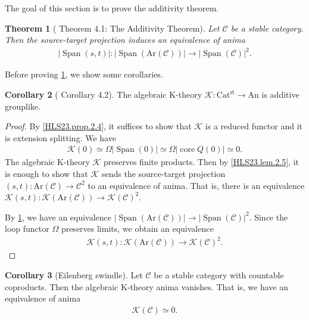 \documentclass[a4paper,dvipdfmx,11pt,reqno]{amsart}
\newcommand{\C}{\mathcal{C}}
\newcommand{\K}{\mathcal{K}}
\DeclareMathOperator{\core}{core}
\DeclareMathOperator{\Span}{Span}
\newcommand{\An}{\mathrm{An}}
\newcommand{\Catst}{\mathrm{Cat^{st}}}
\newcommand{\Ar}{\mathrm{Ar}}
\newtheorem{theorem}{Theorem}[section]
\theoremstyle{definition}
\newtheorem{corollary}[theorem]{Corollary}
\begin{document}
The goal of this section is to prove the additivity theorem.

\begin{theorem}[\cite{HLS23} Theorem 4.1: The Additivity Theorem] \label{thrm.additivity_theorem}
  Let $\C$ be a stable category.
  Then the source-target projection induces an equivalence of anima 
  \begin{align*}
    |\Span(s,t)| : |\Span(\Ar(\C))| \to |\Span(\C)|^2.
  \end{align*}
\end{theorem}

Before proving \cref{thrm.additivity_theorem}, we show some corollaries.

\begin{corollary}[\cite{HLS23} Corollary 4.2] \label{HLS23.cor.4.2}
  The algebraic K-theory $\K : \Catst \to \An$ is additive grouplike.
\end{corollary}

\begin{proof}
  By \cref{HLS23.prop.2.4}, it suffices to show that $\K$ is a reduced functor and it is extension splitting.
  We have 
  \begin{align*}
    \K(0) \simeq \Omega|\Span(0)| \simeq \Omega|\core Q(0)| \simeq 0.
  \end{align*}
  The algebraic K-theory $\K$ preserves finite products.
  Then by \cref{HLS23.lem.2.5}, it is enough to show that $\K$ sends the source-target projection $(s,t) : \Ar(\C) \to \C^2$ to an equivalence of anima.
  That is, there is an equivalence $\K(s,t) : \K(\Ar(\C)) \to \K(\C)^2$.
  
  By \cref{thrm.additivity_theorem}, we have an equivalence $|\Span(\Ar(\C))| \to |\Span(\C)|^2$.
  Since the loop functor $\Omega$ preserves limits, we obtain an equivalence
  \begin{align*}
    \K(s,t) : \K(\Ar(\C)) \to \K(\C)^2.
  \end{align*}
\end{proof}

\begin{corollary}[Eilenberg swindle] \label{Ber.prop.A.4}
  Let $\C$ be a stable category with countable coproducts.
  Then the algebraic K-theory anima vanishes.
  That is, we have an equivalence of anima
  \begin{align*}
    \K(\C) \simeq 0.
  \end{align*}
\end{corollary}
\end{document}
